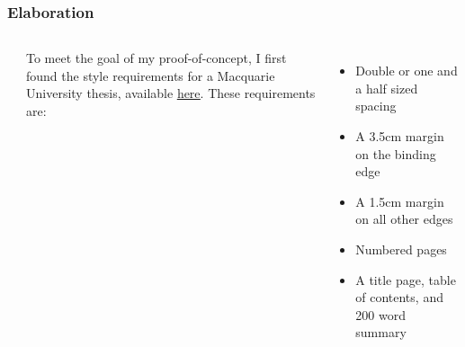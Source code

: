 \documentclass[aspectratio = 169]{beamer}
\begin{document}
\begin{frame}
\label{elaboration}
\frametitle{Elaboration}
\begin{columns}



\hyperlink{introI}{} \newline
\hyperlink{introII}{} \newline 
\hyperlink{scoping}{} \newline
\hyperlink{elaboration}{} \newline  
\hyperlink{software}{} \newline 
\hyperlink{toolchain}{} \newline 
\hyperlink{learning}{} \newline 
\hyperlink{problems}{} \newline 
\hyperlink{results}{} \newline
\hyperlink{exampleI}{} \newline 
\hyperlink{exampleII}{}  



To meet the goal of my proof-of-concept, I first found the style requirements for a Macquarie University thesis, available \href{http://www.hdr.mq.edu.au/information\_for/current\_candidates/thesis\_preparation\#presentation}{\underline{here}}. These requirements are:

\begin{itemize}
\item Double or one and a half sized spacing
\item A 3.5cm margin on the binding edge
\item A 1.5cm margin on all other edges
\item Numbered pages
\item A title page, table of contents, and 200 word summary
\end{itemize}

\end{columns}
\end{frame}



\end{document}
